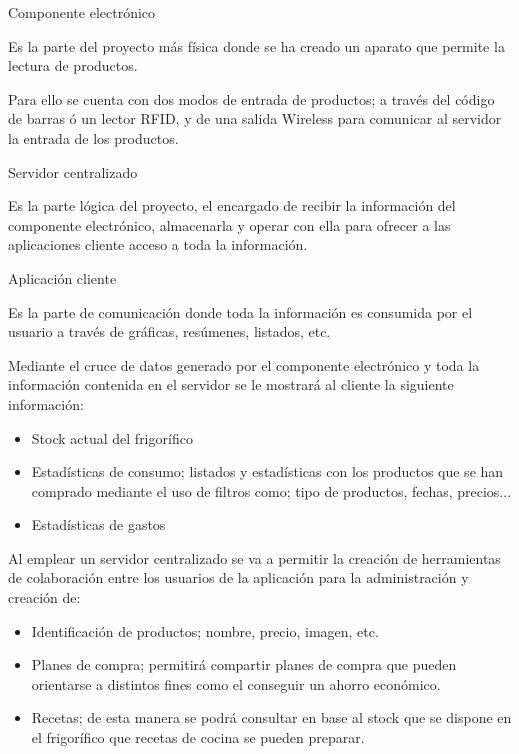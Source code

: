  \begin{description}
    \item Componente electrónico

    Es la parte del proyecto más física donde se ha creado un aparato que permite la lectura de productos.

    Para ello se cuenta con dos modos de entrada de productos; a través del código de barras ó un lector RFID, y de una salida Wireless para comunicar al servidor la entrada de los productos.

    \item Servidor centralizado

    Es la parte lógica del proyecto, el encargado de recibir la información del componente electrónico, almacenarla y operar con ella para ofrecer a las aplicaciones cliente acceso a toda la información.

    \item Aplicación cliente

    Es la parte de comunicación donde toda la información es consumida por el usuario a través de gráficas, resúmenes, listados, etc.

    Mediante el cruce de datos generado por el componente electrónico y toda la información contenida en el servidor se le mostrará al cliente la siguiente información:
        \begin{itemize}
        \item Stock actual del frigorífico
        \item Estadísticas de consumo; listados y estadísticas con los productos que se han comprado mediante el uso de filtros como; tipo de productos, fechas, precios...
        \item Estadísticas de gastos
        \end{itemize}

    Al emplear un servidor centralizado se va a permitir la creación de herramientas de colaboración entre los usuarios de la aplicación para la administración y creación de:
        \begin{itemize}
        \item Identificación de productos; nombre, precio, imagen, etc.
        \item Planes de compra; permitirá compartir planes de compra que pueden orientarse a distintos fines como el conseguir un ahorro económico.
        \item Recetas; de esta manera se podrá consultar en base al stock que se dispone en el frigorífico que recetas de cocina se pueden preparar.
        \end{itemize}
\end{description}